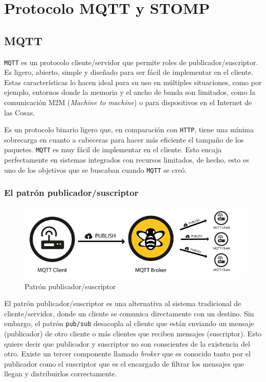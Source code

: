 \chapter{Protocolo MQTT y STOMP}
\pagestyle{esitscCD}

\section{MQTT}

\texttt{MQTT} es un protocolo cliente/servidor que permite roles de publicador/suscriptor.
Es ligero, abierto, simple y diseñado para ser fácil de implementar en el cliente.
Estas características lo hacen ideal para su uso en múltiples situaciones, como por ejemplo,
entornos donde la memoria y el ancho de banda son limitados, como la comunicación M2M
(\emph{Machine to machine}) o para dispositivos en el Internet de las Cosas.

Es un protocolo binario ligero que, en comparación con \texttt{HTTP}, tiene una
mínima sobrecarga en cuanto a cabeceras para hacer más eficiente el tampaño de los
paquetes.
\texttt{MQTT} es muy fácil de implementar en el cliente. Esto encaja perfectamente
en sistemas integrados con recursos limitados, de hecho,
esto es uno de los objetivos que se buscaban cuando \texttt{MQTT} se creó.

\subsection{El patrón publicador/suscriptor}

\begin{figure}[htbp]
\centering
\includegraphics[width=\linewidth]{04-mqtt/figuras/fig001}
\caption{Patrón publicador/suscriptor}
\label{fig:figura1}
\end{figure}

El patrón publicador/suscriptor es una alternativa al sistema tradicional de
cliente/servidor, donde un cliente se comunica directamente con un destino.
Sin embargo, el patrón \texttt{pub/sub} desacopla al cliente que están enviando
un mensaje (publicador) de otro cliente o más clientes que reciben mensajes
(suscriptor). Esto quiere decir que publicador y suscriptor no son conscientes
de la existencia del otro. Existe un tercer componente llamado \emph{broker} que
es conocido tanto por el publicador como el suscriptor que es el encargado de
filtrar los mensajes que llegan y distribuirlos correctamente.

